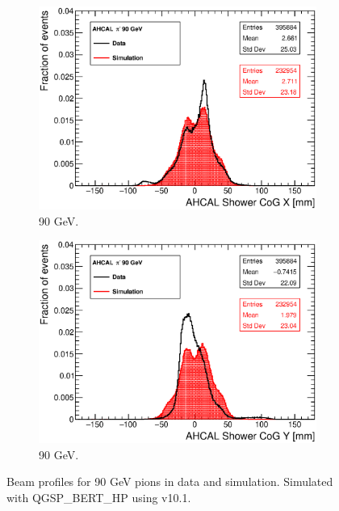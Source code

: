 \begin{figure}[htbp!]
  \centering
  \begin{subfigure}[t]{0.49\textwidth}
    \includegraphics[width=1.\linewidth]{../Thesis_Plots/Validation/Plots/Run24332_CoGX_AHCAL_90GeV_Comparison.eps}
    \caption{90 GeV.} \label{fig:pi90GeVX}
  \end{subfigure}
  \hfill
  \begin{subfigure}[t]{0.49\textwidth}
    \includegraphics[width=1.\linewidth]{../Thesis_Plots/Validation/Plots/Run24332_CoGY_AHCAL_90GeV_Comparison.eps}
    \caption{90 GeV.} \label{fig:pi90GeVY}
  \end{subfigure}
  \caption{Beam profiles for 90 GeV pions in data and simulation. Simulated with QGSP\_BERT\_HP using \geant v10.1.}
\end{figure}

